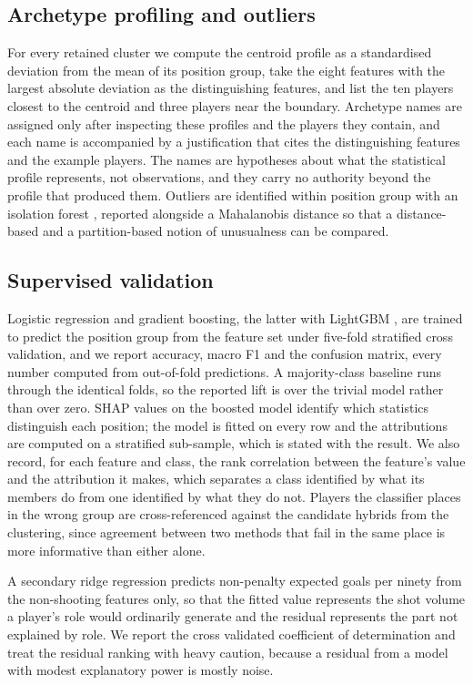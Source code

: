 \subsection{Archetype profiling and outliers}

For every retained cluster we compute the centroid profile as a standardised deviation from the
mean of its position group, take the eight features with the largest absolute deviation as the
distinguishing features, and list the ten players closest to the centroid and three players near
the boundary. Archetype names are assigned only after inspecting these profiles and the players
they contain, and each name is accompanied by a justification that cites the distinguishing
features and the example players. The names are hypotheses about what the statistical profile
represents, not observations, and they carry no authority beyond the profile that produced them.
Outliers are identified within position group with an isolation forest \citep{liu2008isolation},
reported alongside a Mahalanobis distance so that a distance-based and a partition-based notion
of unusualness can be compared.

\subsection{Supervised validation}

Logistic regression and gradient boosting, the latter with LightGBM \citep{ke2017lightgbm}, are
trained to predict the position group from the feature set under five-fold stratified cross
validation, and we report accuracy, macro F1 and the confusion matrix, every number computed
from out-of-fold predictions. A majority-class baseline runs through the identical folds, so the
reported lift is over the trivial model rather than over zero. SHAP values
\citep{lundberg2017unified} on the boosted model identify which statistics distinguish each
position; the model is fitted on every row and the attributions are computed on a stratified
sub-sample, which is stated with the result. We also record, for each feature and class, the rank
correlation between the feature's value and the attribution it makes, which separates a class
identified by what its members do from one identified by what they do not. Players the classifier
places in the wrong group are cross-referenced against the candidate hybrids from the clustering,
since agreement between two methods that fail in the same place is more informative than either
alone.

A secondary ridge regression predicts non-penalty expected goals per ninety from the non-shooting
features only, so that the fitted value represents the shot volume a player's role would
ordinarily generate and the residual represents the part not explained by role. We report the
cross validated coefficient of determination and treat the residual ranking with heavy caution,
because a residual from a model with modest explanatory power is mostly noise.

